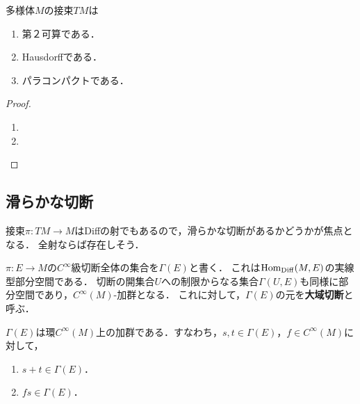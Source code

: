 \documentclass[uplatex,dvipdfmx]{jsreport}
\begin{document}
\begin{proposition}[接束も多様体である]
    多様体$M$の接束$TM$は
    \begin{enumerate}
        \item 第２可算である．
        \item Hausdorffである．
        \item パラコンパクトである．
    \end{enumerate}
\end{proposition}
\begin{proof}\mbox{}
    \begin{enumerate}
        \item 
        \item 
    \end{enumerate}
\end{proof}

\begin{definition}
    
\end{definition}

\subsection{滑らかな切断}

\begin{tcolorbox}[colframe=ForestGreen, colback=ForestGreen!10!white,breakable,colbacktitle=ForestGreen!40!white,coltitle=black,fonttitle=\bfseries\sffamily,
title=]
    接束$\pi:TM\to M$はDiffの射でもあるので，滑らかな切断があるかどうかが焦点となる．
    全射ならば存在しそう．
\end{tcolorbox}

\begin{definition}
    $\pi:E\to M$の$C^\infty$級切断全体の集合を$\Gamma(E)$と書く．
    これは$\mathrm{Hom}_{\mathrm{Diff}}(M,E)$の実線型部分空間である．
    切断の開集合$U$への制限からなる集合$\Gamma(U,E)$も同様に部分空間であり，$C^\infty(M)$-加群となる．
    これに対して，$\Gamma(E)$の元を\textbf{大域切断}と呼ぶ．
\end{definition}

\begin{proposition}
    $\Gamma(E)$は環$C^\infty(M)$上の加群である．すなわち，$s,t\in\Gamma(E)$，$f\in C^\infty(M)$に対して，
    \begin{enumerate}
        \item $s+t\in\Gamma(E)$．
        \item $fs\in\Gamma(E)$．
    \end{enumerate}
\end{proposition}
\end{document}
